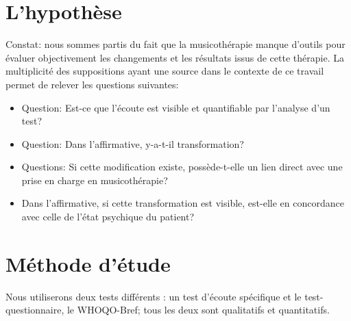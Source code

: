  

  


\section{L'hypothèse}


   Constat: nous sommes partis  du fait que la musicothérapie manque d'outils
   pour évaluer objectivement les changements et les résultats issus
   de cette thérapie. La
   multiplicité des suppositions ayant une source
   dans le contexte de ce travail permet de relever les questions
   suivantes:  



 
 \begin{itemize}
 \item  Question:
   Est-ce que l'écoute est visible et quantifiable par
          l'analyse d'un test?
 
 \end{itemize}
 	
 \begin{itemize}
 \item Question:
   Dans l'affirmative, y-a-t-il transformation?
   
\end{itemize}
 
\begin{itemize}
          
 \item Questions:
   Si cette modification existe, possède-t-elle un lien direct avec une prise en charge
  en musicothérapie?
  
  \item Dans l'affirmative, 
   si cette transformation est visible, est-elle en 
 	concordance 
 	avec celle de l'état psychique du patient?
        
 \end{itemize}

 






 

\section{Méthode d'étude}

	Nous utiliserons deux tests différents : 
	un test d'écoute spécifique
	et le test-questionnaire, le WHOQO-Bref; tous les deux sont
        qualitatifs et quantitatifs.

		
